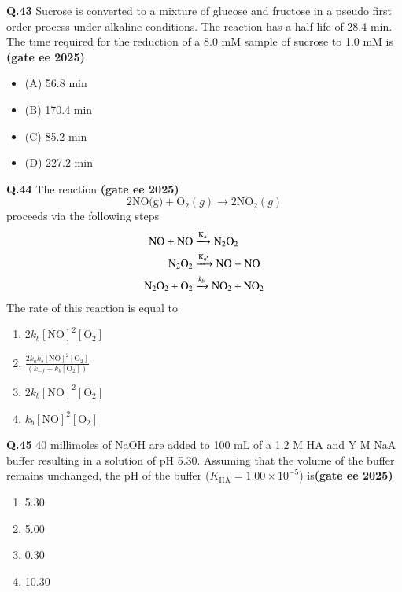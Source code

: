 \documentclass[journal,12pt,onecolumn]{exam}
\theoremstyle{remark}
\begin{document}
\noindent \textbf{Q.43} Sucrose is converted to a mixture of glucose and fructose in a pseudo first order process under alkaline conditions. The reaction has a half life of 28.4 min. The time required for the reduction of a 8.0 mM sample of sucrose to 1.0 mM is \hfill{\textbf{(gate ee 2025)}}

\begin{multicols}{2}
\begin{itemize}[label={}, leftmargin=*, itemsep=0pt]
\item (A) 56.8 min
\item (B) 170.4 min
\item (C) 85.2 min
\item (D) 227.2 min
\end{itemize}
\end{multicols}
\vspace{0.5cm}

\noindent\textbf{Q.44} The reaction \hfill{\textbf{(gate ee 2025)}}
\[
\text{2NO(g)} + \text{O}_2(g) \rightarrow \text{2NO}_2(g)
\]
proceeds via the following steps \hfill{   }
\[
\begin{aligned}
\text{NO + NO} &\xrightarrow{\ce{K_a}} \text{N}_2\text{O}_2 \\
\text{N}_2\text{O}_2 &\xrightarrow{\ce{K_{a'}}} \text{NO + NO} \\
\text{N}_2\text{O}_2 + \text{O}_2 &\xrightarrow{k_b} \text{NO}_2 + \text{NO}_2
\end{aligned}
\]
The rate of this reaction is equal to \hfill{   }
\begin{multicols}{2}
\begin{enumerate}[label=(\Alph*)]
    \item $2k_b[\text{NO}]^2[\text{O}_2]$
    \item $\frac{2k_a k_b[\text{NO}]^2[\text{O}_2]}{(k_{-f}+k_b[\text{O}_2])}$
    \item $2k_b[\text{NO}]^2[\text{O}_2]$
    \item $k_b[\text{NO}]^2[\text{O}_2]$
\end{enumerate}
\end{multicols}

\noindent\textbf{Q.45} 40 millimoles of NaOH are added to 100 mL of a 1.2 M HA and Y M NaA buffer resulting in a solution of pH 5.30. Assuming that the volume of the buffer remains unchanged, the pH of the buffer ($K_\text{HA} = 1.00 \times 10^{-5}$) is\hfill{\textbf{(gate ee 2025)}}
\begin{multicols}{2}
\begin{enumerate}[label=(\Alph*)]
    \item 5.30
    \item 5.00
    \item 0.30
    \item 10.30
\end{enumerate}
\end{multicols}
\end{document}
